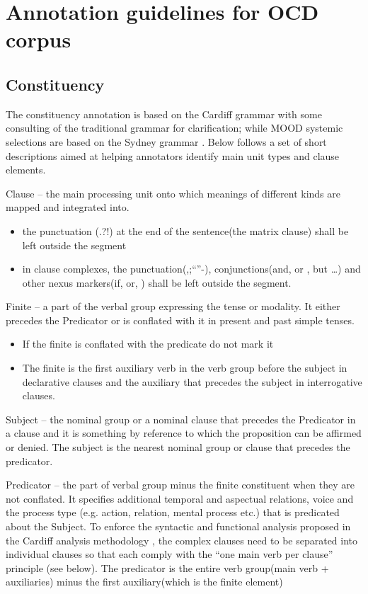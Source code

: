 \chapter{Annotation guidelines for OCD corpus}
\label{ch:corpus-annotation-methodology}

\section{Constituency}

The constituency annotation is based on the Cardiff grammar \citep{Fawcett2008} with some consulting of the traditional grammar \citep{Quirk1985} for clarification; while MOOD systemic selections are based on the Sydney grammar \citep{Halliday2013}. Below follows a set of short descriptions aimed at helping annotators identify main unit types and clause elements. 

Clause -- the main processing unit onto which meanings of different kinds are mapped and integrated into.
\begin{itemize}
  \item the punctuation (.?!) at the end of the sentence(the matrix clause) shall be left outside the segment
  \item in clause complexes, the punctuation(,;``''-), conjunctions(and, or , but \dots) and other nexus markers(if, or, ) shall be left outside the segment. 
\end{itemize}

Finite -- a part of the verbal group expressing the tense or modality. It either precedes the Predicator or is conflated with it in present and past simple tenses.
\begin{itemize}
    \item If the finite is conflated with the predicate do not mark it
    \item The finite is the first auxiliary verb in the verb group before the subject in declarative clauses and the auxiliary that precedes the subject in interrogative clauses. 
\end{itemize}

Subject -- the nominal group or a nominal clause that precedes the Predicator in a clause and it is something by reference to which the proposition can be affirmed or denied. The subject is the nearest nominal group or clause that precedes the predicator. 

Predicator -- the part of verbal group minus the finite constituent when they are not conflated. It specifies additional temporal and aspectual relations, voice and the process type (e.g. action, relation, mental process etc.) that is predicated about the Subject. To enforce the syntactic and functional analysis proposed in the Cardiff analysis methodology \citep{Fawcett2008}, the complex clauses need to be separated into individual clauses so that each comply with the ``one main verb per clause'' principle (see below). The predicator is the entire verb group(main verb + auxiliaries) minus the first auxiliary(which is the finite element)

